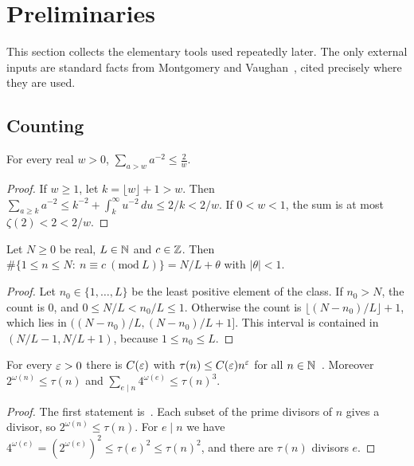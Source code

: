 \section{Preliminaries}\label{sec:prelim}

This section collects the elementary tools used repeatedly later. The only external inputs are standard facts from Montgomery and Vaughan~\cite{MV2007}, cited precisely where they are used.

\subsection{Counting}

\begin{lemma}\label{lem:tail}
For every real $w>0$, $\displaystyle\sum_{a>w}a^{-2}\le\frac2w$.
\end{lemma}

\begin{proof}
If $w\ge1$, let $k=\lfloor w\rfloor+1>w$. Then $\sum_{a\ge k}a^{-2}\le k^{-2}+\int_k^\infty u^{-2}\,du\le 2/k<2/w$. If $0<w<1$, the sum is at most $\zeta(2)<2<2/w$.
\end{proof}

\begin{lemma}\label{lem:class}
Let $N\ge0$ be real, $L\in\mathbb{N}$ and $c\in\mathbb{Z}$. Then $\#\{1\le n\le N:\ n\equiv c\ (\mathrm{mod}\ L)\}=N/L+\theta$ with $|\theta|<1$.
\end{lemma}

\begin{proof}
Let $n_0\in\{1,\dots,L\}$ be the least positive element of the class. If $n_0>N$, the count is $0$, and $0\le N/L<n_0/L\le1$. Otherwise the count is $\lfloor(N-n_0)/L\rfloor+1$, which lies in $\bigl((N-n_0)/L,(N-n_0)/L+1\bigr]$. This interval is contained in $(N/L-1,N/L+1)$, because $1\le n_0\le L$.
\end{proof}

\begin{lemma}\label{lem:divisor}
For every $\varepsilon>0$ there is $C(\varepsilon)$ with $\tau(n)\le C(\varepsilon)n^\varepsilon$ for all $n\in\mathbb{N}$~\cite[(2.20)]{MV2007}. Moreover $2^{\omega(n)}\le\tau(n)$ and $\sum_{e\mid n}4^{\omega(e)}\le\tau(n)^3$.
\end{lemma}

\begin{proof}
The first statement is~\cite[(2.20)]{MV2007}. Each subset of the prime divisors of $n$ gives a divisor, so $2^{\omega(n)}\le\tau(n)$. For $e\mid n$ we have $4^{\omega(e)}=(2^{\omega(e)})^2\le\tau(e)^2\le\tau(n)^2$, and there are $\tau(n)$ divisors $e$.
\end{proof}


